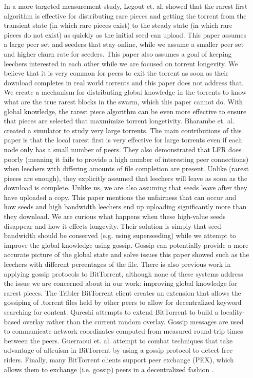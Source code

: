 In a more targeted measurement study, Legout et. al. \cite{legout:1} showed
that the rarest first algorithm is effective for distributing rare
pieces and getting the torrent from the transient state (in which
rare pieces exist) to the steady state (in which rare pieces do not
exist) as quickly as the initial seed can upload. This paper assumes
a large peer set and seeders that stay online, while we assume a
smaller peer set and higher churn rate for seeders. This paper also
assumes a goal of keeping leechers interested in each other while we
are focused on torrent longevity. We believe that it is very common
for peers to exit the torrent as soon as their download completes in
real world torrents and this paper does not address that. We create
a mechanism for distributing global knowledge in the torrents to
know what are the true rarest blocks in the swarm, which this paper
cannot do. With global knowledge, the rarest piece algorithm can be
even more effective to ensure that pieces are selected that maxmimize
torrent longetivity.  Bharambe et. al. \cite{bharambe} created a simulator to
study very large torrents. The main contributions of this paper is
that the local rarest first is very effective for large torrents even
if each node only has a small number of peers. They also demonstrated
that LFR does poorly (meaning it fails to provide a high number of
interesting peer connections) when leechers with differing amounts
of file completion are present. Unlike (rarest pieces are enough),
they explicitly assumed that leechers will leave as soon as the
download is complete. Unlike us, we are also assuming that seeds
leave after they have uploaded a copy. This paper mentions the
unfairness that can occur and how seeds and high bandwidth leechers
end up uploading significantly more than they download. We are
curious what happens when these high-value seeds disappear and how
it effects longevity. Their solution is simply that seed bandwidth
should be conserved (e.g. using superseeding) while we attempt to
improve the global knowledge using gossip. Gossip can potentially
provide a more accurate picture of the global state and solve issues
this paper showed such as the leechers with different percentages of
the file.  There is also previous work in applying gossip protocols to
BitTorrent, although none of these systems address the issue we are
concerned about in our work: improving global knowledge for rarest
pieces. The Tribler BitTorrent \cite{tribler} client creates an extension
that allows the gossiping of .torrent files held by other peers
to allow for decentralized keyword searching for content. Qureshi
\cite{proximity} attempts to extend BitTorrent to build a locality-based overlay
rather than the current random overlay. Gossip messages are used to
communicate network coordinates computed from measured round-trip
times between the peers. Guerraoui et. al. \cite{freerider} attempt to combat
techniques that take advantage of altruism in BitTorrent by using
a gossip protocol to detect free riders. Finally, many BitTorrent
clients support peer exchange (PEX), which allows them to exchange
(i.e. gossip) peers in a decentralized fashion \cite{pex}.
